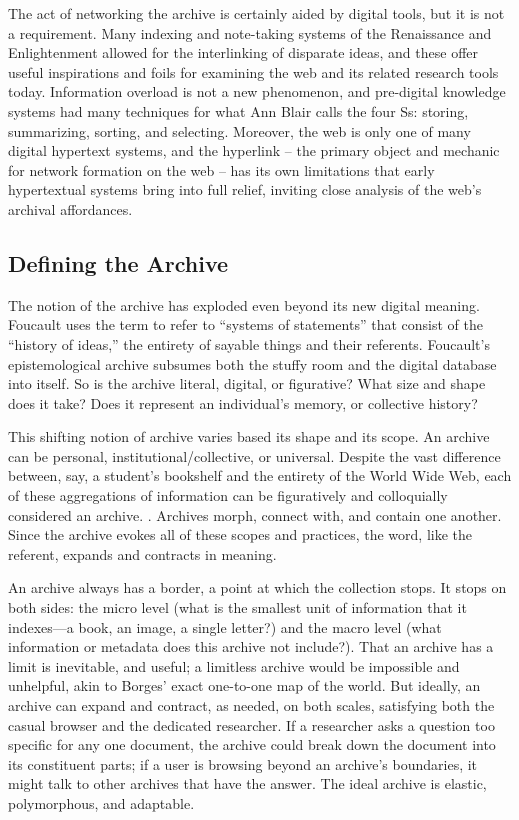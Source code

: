 The act of networking the archive is certainly aided by digital tools, but it is not a requirement. Many indexing and note-taking systems of the Renaissance and Enlightenment allowed for the interlinking of disparate ideas, and these offer useful inspirations and foils for examining the web and its related research tools today. Information overload is not a new phenomenon, and pre-digital knowledge systems had many techniques for what Ann Blair calls the four Ss: storing, summarizing, sorting, and selecting.  Moreover, the web is only one of many digital hypertext systems, and the hyperlink – the primary object and mechanic for network formation on the web – has its own limitations that early hypertextual systems bring into full relief, inviting close analysis of the web’s archival affordances.

\subsection{Defining the Archive}

The notion of the archive has exploded even beyond its new digital meaning. Foucault uses the term to refer to “systems of statements” that consist of the “history of ideas,” the entirety of sayable things and their referents.  Foucault’s epistemological archive subsumes both the stuffy room and the digital database into itself. So is the archive literal, digital, or figurative? What size and shape does it take? Does it represent an individual’s memory, or collective history?

This shifting notion of archive varies based its shape and its scope. An archive can be personal, institutional/collective, or universal. Despite the vast difference between, say, a student’s bookshelf and the entirety of the World Wide Web, each of these aggregations of information can be figuratively and colloquially considered an archive. . Archives morph, connect with, and contain one another. Since the archive evokes all of these scopes and practices, the word, like the referent, expands and contracts in meaning.

An archive always has a border, a point at which the collection stops. It stops on both sides: the micro level (what is the smallest unit of information that it indexes—a book, an image, a single letter?) and the macro level (what information or metadata does this archive not include?). That an archive has a limit is inevitable, and useful; a limitless archive would be impossible and unhelpful, akin to Borges’ exact one-to-one map of the world.  But ideally, an archive can expand and contract, as needed, on both scales, satisfying both the casual browser and the dedicated researcher. If a researcher asks a question too specific for any one document, the archive could break down the document into its constituent parts; if a user is browsing beyond an archive’s boundaries, it might talk to other archives that have the answer. The ideal archive is elastic, polymorphous, and adaptable.

